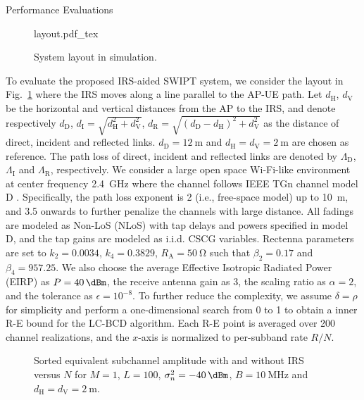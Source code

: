 \documentclass[journal]{IEEEtran}
\begin{document}
	\begin{section}{Performance Evaluations}\label{se:performance_evaluation}
		\begin{figure}[!t]
			\centering
			\def\svgwidth{0.9\columnwidth}
			{layout.pdf_tex}
			\caption{System layout in simulation.}
			\label{fi:layout}
		\end{figure}

		To evaluate the proposed IRS-aided SWIPT system, we consider the layout in Fig.~\ref{fi:layout} where the IRS moves along a line parallel to the AP-UE path. Let $d_{\mathrm{H}}$, $d_{\mathrm{V}}$ be the horizontal and vertical distances from the AP to the IRS, and denote respectively $d_{\mathrm{D}}$, $d_{\mathrm{I}}=\sqrt{d_{\mathrm{H}}^2+d_{\mathrm{V}}^2}$, $d_{\mathrm{R}}=\sqrt{(d_{\mathrm{D}}-d_{\mathrm{H}})^2+d_{\mathrm{V}}^2}$ as the distance of direct, incident and reflected links. $d_{\mathrm{D}}=\SI{12}{\meter}$ and $d_{\mathrm{H}}=d_{\mathrm{V}}=\SI{2}{\meter}$ are chosen as reference. The path loss of direct, incident and reflected links are denoted by $\Lambda_{\mathrm{D}}$, $\Lambda_{\mathrm{I}}$ and $\Lambda_{\mathrm{R}}$, respectively. We consider a large open space Wi-Fi-like environment at center frequency \SI{2.4}{\GHz} where the channel follows IEEE TGn channel model D \cite{Erceg2004}. Specifically, the path loss exponent is \num{2} (i.e., free-space model) up to \SI{10}{\meter}, and \num{3.5} onwards to further penalize the channels with large distance. All fadings are modeled as Non-LoS (NLoS) with tap delays and powers specified in model D, and the tap gains are modeled as i.i.d. CSCG variables. Rectenna parameters are set to $k_2=0.0034$, $k_4=0.3829$, $R_{\mathrm{A}}=\SI{50}{\ohm}$ \cite{Clerckx2016a} such that $\beta_2=0.17$ and $\beta_4=957.25$. We also choose the average Effective Isotropic Radiated Power (EIRP) as $P=\SI{40}{\dBm}$, the receive antenna gain as \SI{3}{\dBi}, the scaling ratio as $\alpha=2$, and the tolerance as $\epsilon=10^{-8}$. To further reduce the complexity, we assume $\delta=\rho$ for simplicity and perform a one-dimensional search from \num{0} to \num{1} to obtain a inner R-E bound for the LC-BCD algorithm. Each R-E point is averaged over \num{200} channel realizations, and the $x$-axis is normalized to per-subband rate $R/N$.

		\begin{figure}[!t]
			\centering
			\resizebox{0.8\columnwidth}{!}{
				
			}
			\caption{Sorted equivalent subchannel amplitude with and without IRS versus $N$ for $M=1$, $L=100$, $\sigma_n^2=\SI{-40}{\dBm}$, $B=\SI{10}{\MHz}$ and $d_{\mathrm{H}}=d_{\mathrm{V}}=\SI{2}{\meter}$.}
			\label{fi:channel_amplitude}
		\end{figure}


\end{section}
\end{document}
